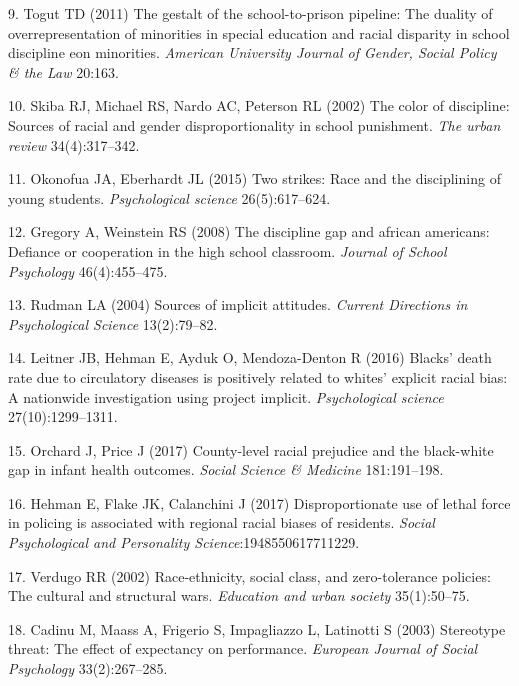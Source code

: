 \documentclass[9pt,twocolumn,twoside,lineno]{pnas-new}
\begin{document}
\hypertarget{ref-togut2011gestalt}{}
9. Togut TD (2011) The gestalt of the school-to-prison pipeline: The
duality of overrepresentation of minorities in special education and
racial disparity in school discipline eon minorities. \emph{American
University Journal of Gender, Social Policy \& the Law} 20:163.

\hypertarget{ref-skiba2002color}{}
10. Skiba RJ, Michael RS, Nardo AC, Peterson RL (2002) The color of
discipline: Sources of racial and gender disproportionality in school
punishment. \emph{The urban review} 34(4):317--342.

\hypertarget{ref-okonofua2015two}{}
11. Okonofua JA, Eberhardt JL (2015) Two strikes: Race and the
disciplining of young students. \emph{Psychological science}
26(5):617--624.

\hypertarget{ref-gregory2008discipline}{}
12. Gregory A, Weinstein RS (2008) The discipline gap and african
americans: Defiance or cooperation in the high school classroom.
\emph{Journal of School Psychology} 46(4):455--475.

\hypertarget{ref-rudman2004sources}{}
13. Rudman LA (2004) Sources of implicit attitudes. \emph{Current
Directions in Psychological Science} 13(2):79--82.

\hypertarget{ref-leitner2016blacks}{}
14. Leitner JB, Hehman E, Ayduk O, Mendoza-Denton R (2016) Blacks' death
rate due to circulatory diseases is positively related to whites'
explicit racial bias: A nationwide investigation using project implicit.
\emph{Psychological science} 27(10):1299--1311.

\hypertarget{ref-orchard2017county}{}
15. Orchard J, Price J (2017) County-level racial prejudice and the
black-white gap in infant health outcomes. \emph{Social Science \&
Medicine} 181:191--198.

\hypertarget{ref-hehman2017disproportionate}{}
16. Hehman E, Flake JK, Calanchini J (2017) Disproportionate use of
lethal force in policing is associated with regional racial biases of
residents. \emph{Social Psychological and Personality
Science}:1948550617711229.

\hypertarget{ref-verdugo2002race}{}
17. Verdugo RR (2002) Race-ethnicity, social class, and zero-tolerance
policies: The cultural and structural wars. \emph{Education and urban
society} 35(1):50--75.

\hypertarget{ref-cadinu2003stereotype}{}
18. Cadinu M, Maass A, Frigerio S, Impagliazzo L, Latinotti S (2003)
Stereotype threat: The effect of expectancy on performance.
\emph{European Journal of Social Psychology} 33(2):267--285.
\end{document}
